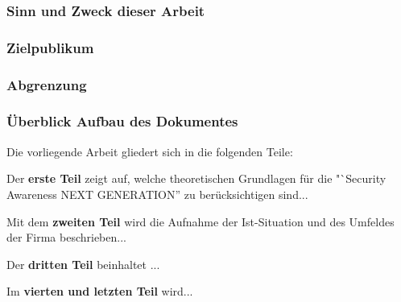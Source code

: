 \documentclass[../../main.tex]{subfiles}
\begin{document}

\subsubsection*{Sinn und Zweck dieser Arbeit}

\subsubsection*{Zielpublikum}

\subsubsection*{Abgrenzung}

\subsubsection*{Überblick Aufbau des Dokumentes}

Die vorliegende Arbeit gliedert sich in die folgenden Teile:

\begin{sloppypar}
Der \textbf{erste Teil} zeigt auf, welche theoretischen Grundlagen für die "`Security Awareness NEXT GENERATION'' zu berücksichtigen sind...\blindtext
\end{sloppypar}

\begin{sloppypar}
Mit dem \textbf{zweiten Teil} wird die Aufnahme der Ist-Situation und des Umfeldes der Firma beschrieben...\blindtext
\end{sloppypar}

\begin{sloppypar}
Der \textbf{dritten Teil} beinhaltet ...\blindtext
\end{sloppypar}

\begin{sloppypar}
Im \textbf{vierten und letzten Teil} wird...\blindtext

\end{sloppypar}
\end{document}
